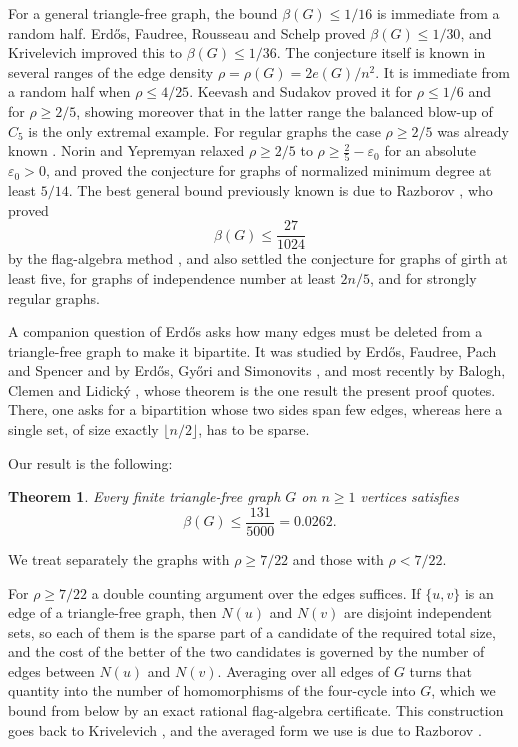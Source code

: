\documentclass[11pt,reqno]{amsart}
\theoremstyle{plain}
\newtheorem{theorem}{Theorem}[section]
\newcommand{\opt}{\beta}
\newcommand{\Nb}{N}
\newcommand{\dens}{\rho}
\begin{document}
For a general triangle-free graph, the bound $\opt(G)\le1/16$ is immediate
from a random half.  Erd\H{o}s, Faudree, Rousseau and Schelp \cite{efrs}
proved $\opt(G)\le1/30$, and Krivelevich \cite{krivelevich} improved this to
$\opt(G)\le1/36$.  The conjecture itself is known in several ranges of the
edge density $\dens=\dens(G)=2e(G)/n^{2}$.  It is immediate from a random half
when $\dens\le4/25$.  Keevash and Sudakov \cite{keevash-sudakov} proved it for
$\dens\le1/6$ and for $\dens\ge2/5$, showing moreover that in the latter range
the balanced blow-up of $C_{5}$ is the only extremal example.  For regular
graphs the case $\dens\ge2/5$ was already known
\cite[Theorem~3]{krivelevich}.  Norin and Yepremyan
\cite{norin-yepremyan} relaxed $\dens\ge2/5$ to
$\dens\ge\tfrac25-\varepsilon_{0}$ for an absolute $\varepsilon_{0}>0$, and
proved the conjecture for graphs of normalized minimum degree at least
$5/14$.  The best
general bound previously known is due to Razborov \cite{razborov-halves}, who
proved
\[
 \opt(G)\le\frac{27}{1024}
\]
by the flag-algebra method \cite{razborov-flag}, and also settled the
conjecture for graphs of girth at least five, for graphs of independence
number at least $2n/5$, and for strongly regular graphs.

A companion question of Erd\H{o}s asks how many edges must be deleted from a
triangle-free graph to make it bipartite.  It was studied by Erd\H{o}s,
Faudree, Pach and Spencer \cite{efps} and by Erd\H{o}s, Gy\H{o}ri and
Simonovits \cite{egs}, and most recently by Balogh, Clemen and Lidick\'y
\cite{bcl}, whose theorem is the one result the present proof quotes.
There, one asks for a bipartition whose two sides span few edges, whereas here
a single set, of size exactly $\lfloor n/2\rfloor$, has to be sparse.

Our result is the following:

\begin{theorem}\label{thm:main}
Every finite triangle-free graph $G$ on $n\ge1$ vertices satisfies
\[
 \opt(G)\le\frac{131}{5000}=0.0262.
\]
\end{theorem}

We treat separately the graphs with $\dens\ge7/22$ and those with
$\dens<7/22$.

For $\dens\ge7/22$ a double counting argument over the edges suffices.  If
$\{u,v\}$ is an edge of a triangle-free graph, then $\Nb(u)$ and $\Nb(v)$ are
disjoint independent sets, so each of them is the sparse part of a candidate of
the required total size, and the cost of the better of the two candidates is
governed by the number of edges between $\Nb(u)$ and $\Nb(v)$.  Averaging over
all edges of $G$ turns that quantity into the number of homomorphisms of the
four-cycle into $G$, which we bound from below by an exact rational
flag-algebra certificate.  This construction goes back to Krivelevich
\cite{krivelevich}, and the averaged form we use is due to Razborov
\cite{razborov-halves}.
\end{document}
